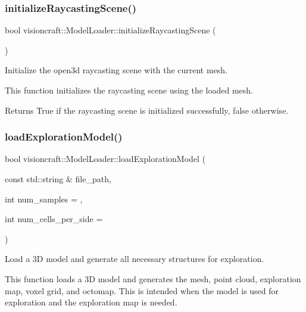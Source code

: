 \subsubsection{\texorpdfstring{initialize\+Raycasting\+Scene()}{initializeRaycastingScene()}}
{\footnotesize\ttfamily bool visioncraft\+::\+Model\+Loader\+::initialize\+Raycasting\+Scene (\begin{DoxyParamCaption}{ }\end{DoxyParamCaption})}



Initialize the open3d raycasting scene with the current mesh. 

This function initializes the raycasting scene using the loaded mesh.

\begin{DoxyReturn}{Returns}
True if the raycasting scene is initialized successfully, false otherwise. 
\end{DoxyReturn}
\mbox{\label{classvisioncraft_1_1ModelLoader_a807ceb7f84c212f019057a621461d7fb}} 
\subsubsection{\texorpdfstring{load\+Exploration\+Model()}{loadExplorationModel()}}
{\footnotesize\ttfamily bool visioncraft\+::\+Model\+Loader\+::load\+Exploration\+Model (\begin{DoxyParamCaption}\item[{const std\+::string \&}]{file\+\_\+path,  }\item[{int}]{num\+\_\+samples = {},  }\item[{int}]{num\+\_\+cells\+\_\+per\+\_\+side = {} }\end{DoxyParamCaption})}



Load a 3D model and generate all necessary structures for exploration. 

This function loads a 3D model and generates the mesh, point cloud, exploration map, voxel grid, and octomap. This is intended when the model is used for exploration and the exploration map is needed.


